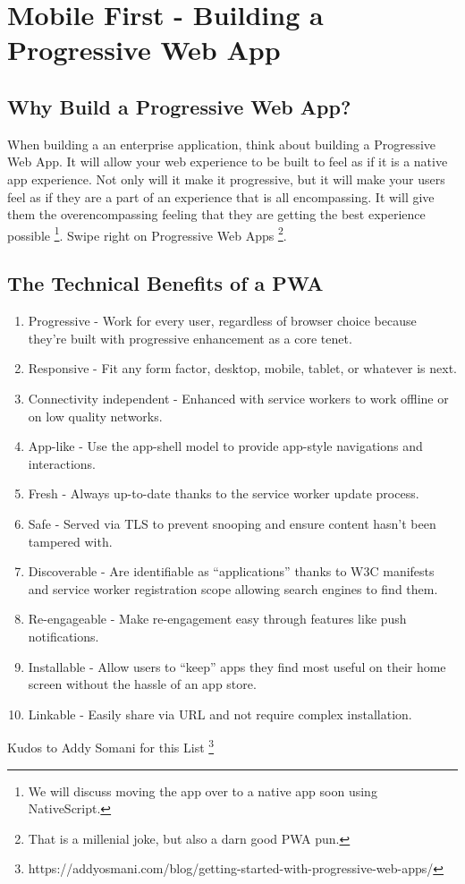 \maketitle{}
\section{ Mobile First - Building a Progressive Web App }

\subsection{ Why Build a Progressive Web App? }
When building a an enterprise application, think about building a Progressive
Web App. It will allow your web experience to be built to feel as if it is a
native app experience. Not only will it make it progressive, but it will make
your users feel as if they are a part of an experience that is all encompassing.
It will give them the overencompassing feeling that they are getting the best
experience possible \footnote{We will discuss moving the app over to a native
app soon using NativeScript.}. Swipe right on Progressive Web Apps \footnote{
That is a millenial joke, but also a darn good PWA pun.}.

\subsection{ The Technical Benefits of a PWA }

\begin{enumerate}
  \item Progressive - Work for every user, regardless of browser choice because
  they’re built with progressive enhancement as a core tenet.
  \item Responsive - Fit any form factor, desktop, mobile, tablet, or whatever
  is next.
  \item Connectivity independent - Enhanced with service workers to work offline
  or on low quality networks.
  \item App-like - Use the app-shell model to provide app-style navigations and
  interactions.
  \item Fresh - Always up-to-date thanks to the service worker update process.
  \item Safe - Served via TLS to prevent snooping and ensure content hasn’t been
  tampered with.
  \item Discoverable - Are identifiable as “applications” thanks to W3C
  manifests and service worker registration scope allowing search engines to find them.
  \item Re-engageable - Make re-engagement easy through features like push
  notifications.
  \item Installable - Allow users to “keep” apps they find most useful on their
  home screen without the hassle of an app store.
  \item Linkable - Easily share via URL and not require complex installation.
\end{enumerate}
Kudos to Addy Somani for this List \footnote{https://addyosmani.com/blog/getting-started-with-progressive-web-apps/}
